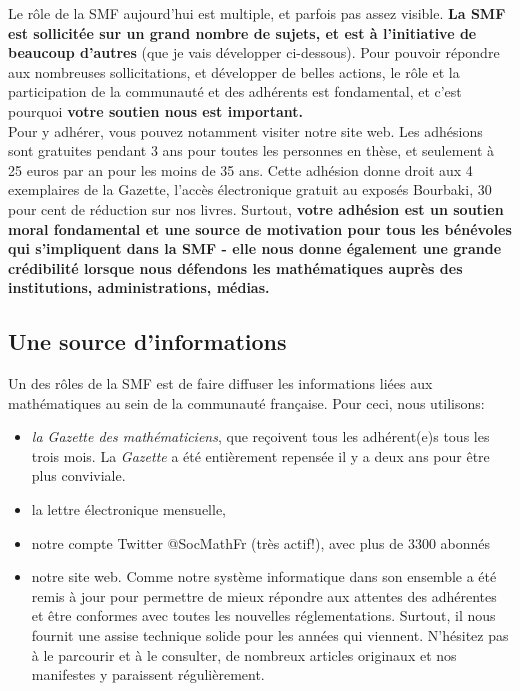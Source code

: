 Le r\^{o}le de la SMF aujourd'hui est multiple, et parfois pas assez visible. {\bf La SMF est sollicit\'ee sur un grand nombre de sujets, et est \`a l'initiative de beaucoup d'autres} (que je vais d\'evelopper ci-dessous). Pour pouvoir r\'epondre aux nombreuses sollicitations, et d\'evelopper de belles actions, le r\^ole et la participation de la communaut\'e et des adh\'erents est fondamental, et c'est pourquoi {\bf votre soutien nous est important.}
\\Pour y adh\'erer, vous pouvez notamment visiter notre site web. Les adh\'esions sont gratuites pendant 3 ans pour toutes les personnes en th\`ese, et seulement \`a 25 euros par an pour les moins de 35 ans. Cette adh\'esion donne droit aux 4 exemplaires de la Gazette, l’acc\`es \'electronique gratuit au expos\'es Bourbaki, 30 pour cent de r\'eduction sur nos livres. Surtout, {\bf votre adh\'esion est un soutien moral fondamental et une source de motivation pour tous les b\'en\'evoles qui s’impliquent dans la SMF - elle nous donne \'egalement une grande cr\'edibilit\'e lorsque nous d\'efendons les math\'ematiques aupr\`es des institutions, administrations, m\'edias.}


\subsection*{Une source d'informations}

 Un des r\^oles de la SMF est de faire diffuser les informations li\'ees aux math\'ematiques au sein de la communaut\'e fran\c caise. Pour ceci, nous utilisons:
 \begin{itemize}
 \item  \emph{la Gazette des math\'{e}\-maticiens}, que re\c{c}oivent tous les adh\'{e}rent(e)s tous les trois mois. La {\em Gazette} a \'et\'e enti\`erement repens\'ee il y a deux ans pour \^etre plus conviviale.
 \item la lettre \'{e}lectronique mensuelle, 
 \item notre compte Twitter @SocMathFr (tr\`es actif!), avec plus de 3300 abonn\'es\
 \item notre site web. Comme notre syst\`eme informatique dans son ensemble a \'et\'e remis \`a jour pour permettre de mieux r\'epondre aux attentes des adh\'erent\mp es et \^etre conformes avec toutes les nouvelles r\'eglementations. Surtout, il nous fournit une assise technique solide pour les ann\'ees qui viennent. N’h\'esitez pas \`a le parcourir et \`a le consulter, de nombreux articles originaux et nos manifestes y paraissent r\'eguli\`erement.
\end{itemize}

